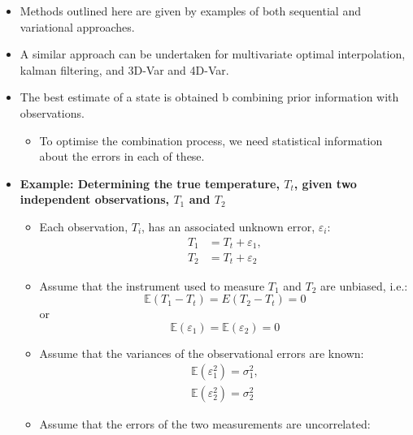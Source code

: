 \begin{itemize}
    \item Methods outlined here are given by examples of both sequential and variational approaches.
    \item A similar approach can be undertaken for multivariate optimal interpolation, kalman filtering, and 3D-Var and 4D-Var.
    \item The best estimate of a state is obtained b combining prior information with observations.
    \begin{itemize}
        \item To optimise the combination process, we need statistical information about the errors in each of these.
    \end{itemize}
    \item \textbf{Example: Determining the true temperature, $T_t$, given two independent observations, $T_1$ and $T_2$}
    \begin{itemize}
        \item Each observation, $T_i$, has an associated unknown error, $\varepsilon_i$:
        \begin{subequations}
            \begin{align}
                 T_1 &= T_t + \varepsilon_1, \\
                 T_2 &= T_t + \varepsilon_2
            \end{align}
        \end{subequations}
        \item Assume that the instrument used to measure $T_1$ and $T_2$ are unbiased, i.e.:
        \begin{equation*}
            \mathbb{E}(T_1 - T_t) = E(T_2 - T_t) = 0 
        \end{equation*}
        or
        \begin{equation}
            \mathbb{E}(\varepsilon_1) = \mathbb{E}(\varepsilon_2) = 0
        \end{equation}
        \item Assume that the variances of the observational errors are known:
        \begin{subequations}
            \begin{align}
                \mathbb{E}(\varepsilon_1^2) = \sigma_1^2, \\
                \mathbb{E}(\varepsilon_2^2) = \sigma_2^2
            \end{align}
        \end{subequations}
        \item Assume that the errors of the two measurements are uncorrelated:

\end{itemize}
\end{itemize}
